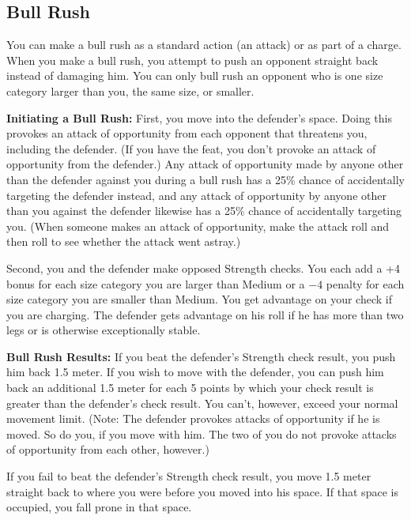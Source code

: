 \subsection{Bull Rush}
You can make a bull rush as a standard action (an attack) or as part of a charge. When you make a bull rush, you attempt to push an opponent straight back instead of damaging him. You can only bull rush an opponent who is one size category larger than you, the same size, or smaller.

\textbf{Initiating a Bull Rush:} First, you move into the defender's space. Doing this provokes an attack of opportunity from each opponent that threatens you, including the defender. (If you have the  feat, you don't provoke an attack of opportunity from the defender.) Any attack of opportunity made by anyone other than the defender against you during a bull rush has a 25\% chance of accidentally targeting the defender instead, and any attack of opportunity by anyone other than you against the defender likewise has a 25\% chance of accidentally targeting you. (When someone makes an attack of opportunity, make the attack roll and then roll to see whether the attack went astray.)

Second, you and the defender make opposed Strength checks. You each add a +4 bonus for each size category you are larger than Medium or a $-4$ penalty for each size category you are smaller than Medium. You get advantage on your check if you are charging. The defender gets advantage on his roll if he has more than two legs or is otherwise exceptionally stable.

\textbf{Bull Rush Results:} If you beat the defender's Strength check result, you push him back 1.5 meter. If you wish to move with the defender, you can push him back an additional 1.5 meter for each 5 points by which your check result is greater than the defender's check result. You can't, however, exceed your normal movement limit. (Note: The defender provokes attacks of opportunity if he is moved. So do you, if you move with him. The two of you do not provoke attacks of opportunity from each other, however.)

If you fail to beat the defender's Strength check result, you move 1.5 meter straight back to where you were before you moved into his space. If that space is occupied, you fall prone in that space.